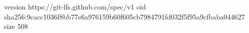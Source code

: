 version https://git-lfs.github.com/spec/v1
oid sha256:9cacc1036f8bb77e6a976159b60f605cb7984791fd032f5f95a9cfbaba044627
size 508
